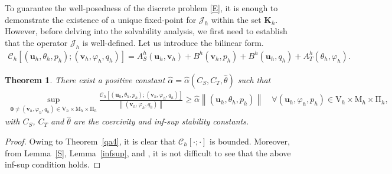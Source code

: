 \documentclass[10pt,a4paper]{article}
\newtheorem{theorem} {\bf Theorem}
\begin{document}
 To guarantee the well-posedness of the discrete problem \eqref{E}, it is enough to demonstrate the existence of a unique fixed-point for $\mathcal{J}_h$ within the set $\boldsymbol{K}_h$. However, before delving into the solvability analysis, we first need to establish that the operator $\mathcal{J}_h$ is well-defined.
Let us introduce the bilinear form.
  		\begin{align}\label{aa}
  		\mathcal{C}_h\left[(\boldsymbol{u}_h, \theta_h, p_h);( \boldsymbol{v}_h,\varphi_h, q_h)\right]={A}_S^h(\boldsymbol{u}_h, \boldsymbol{v}_h) + {B}^h(\boldsymbol{v}_h,p_h) + {B}^h(\boldsymbol{u}_h, q_h) +  {A}^h_T(\theta_h,\varphi_h) .
  		\end{align}
  		\begin{theorem}\label{51}
  			There exist a positive constant $\hat{\alpha}= \hat{\alpha}(C_S,C_T,\hat{\theta})$ such that 
  			\begin{align*}
  			\sup _{\boldsymbol{0} \neq (\boldsymbol{v}_h,\varphi_h , q_h) \in \mathrm{V}_h \times \mathrm{M}_h \times  \mathrm{\Pi}_h}\frac{\mathcal{C}_h\left[\left( \boldsymbol{u}_h, \theta_h, p_h\right);\left( \boldsymbol{v}_h, \varphi_h, q_h \right)\right]}{\left\|\left( \boldsymbol{v}_h, \varphi_h, q_h \right)\right\|} \geq \hat{\alpha}\left\|\left(\boldsymbol{u}_h,\theta_h, p_h\right)\right\| \quad \forall\left( \boldsymbol{u}_h,\varphi_h,p_h\right) \in \mathrm{V}_h \times \mathrm{M}_h \times \mathrm{\Pi}_h,
  			\end{align*}
  			with $C_S$, $C_T$ and $\hat{\theta}$ are the coercivity and inf-sup stability constants. 
  		\end{theorem}
\begin{proof}
    Owing to Theorem~\ref{qa4}, it is clear that $\mathcal{C}_h\left[\cdot ; \cdot \right]$ is bounded. Moreover, from Lemma~\ref{S}, Lemma~\ref{infsup}, and \cite[Proposition 2.36]{MR2050138}, it is not difficult to see that the above inf-sup condition holds.
\end{proof}
\end{document}
